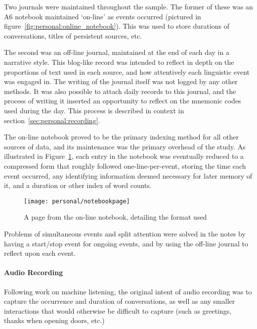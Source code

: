 Two journals were maintained throughout the sample.  The former of these was an A6 notebook maintained `on-line' as events occurred (pictured in figure~\ref{fig:personal:online_notebook}).  This was used to store durations of conversations, titles of persistent sources, etc.

The second was an off-line journal, maintained at the end of each day in a narrative style.  This blog-like record was intended to reflect in depth on the proportions of text used in each source, and how attentively each linguistic event was engaged in.  The writing of the journal itself was not logged by any other methods.  It was also possible to attach daily records to this journal, and the process of writing it inserted an opportunity to reflect on the mnemonic codes used during the day.  This process is described in context in section~\ref{sec:personal:recording}.

The on-line notebook proved to be the primary indexing method for all other sources of data, and its maintenance was the primary overhead of the study.  As illustrated in Figure~\ref{fig:personal:notebookformat}, each entry in the notebook was eventually reduced to a compressed form that roughly followed one-line-per-event, storing the time each event occurred, any identifying information deemed necessary for later memory of it, and a duration or other index of word counts.

\begin{figure}[p]
    \centering
    \texttt{[image: personal/notebookpage]}
    \caption{A page from the on-line notebook, detailing the format used}
    \label{fig:personal:notebookformat}
\end{figure}


Problems of simultaneous events and split attention were solved in the notes by having a start/stop event for ongoing events, and by using the off-line journal to reflect upon each event.

\paragraph{Audio Recording}
Following work on machine listening, the original intent of audio recording was to capture the occurrence and duration of conversations, as well as any smaller interactions that would otherwise be difficult to capture (such as greetings, thanks when opening doors, etc.)


